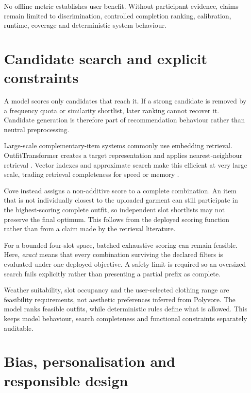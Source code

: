 No offline metric establishes user benefit. Without participant evidence,
claims remain limited to discrimination, controlled completion ranking,
calibration, runtime, coverage and deterministic system behaviour.

\section{Candidate search and explicit constraints}

A model scores only candidates that reach it. If a strong candidate is removed
by a frequency quota or similarity shortlist, later ranking cannot recover it.
Candidate generation is therefore part of recommendation behaviour rather than
neutral preprocessing.

Large-scale complementary-item systems commonly use embedding retrieval.
OutfitTransformer creates a target representation and applies nearest-neighbour
retrieval \parencite{sarkar2023outfittransformer}. Vector indexes and
approximate search make this efficient at very large scale, trading retrieval
completeness for speed or memory \parencite{johnson2021similarity}.

Cove instead assigns a non-additive score to a complete combination. An item
that is not individually closest to the uploaded garment can still participate
in the highest-scoring complete outfit, so independent slot shortlists may not
preserve the final optimum. This follows from the deployed scoring function
rather than from a claim made by the retrieval literature.

For a bounded four-slot space, batched exhaustive scoring can remain feasible.
Here, \emph{exact} means that every combination surviving the declared filters
is evaluated under one deployed objective. A safety limit is required so an
oversized search fails explicitly rather than presenting a partial prefix as
complete.

Weather suitability, slot occupancy and the user-selected clothing range are
feasibility requirements, not aesthetic preferences inferred from Polyvore.
The model ranks feasible outfits, while deterministic rules define what is
allowed. This keeps model behaviour, search completeness and functional
constraints separately auditable.

\section{Bias, personalisation and responsible design}

